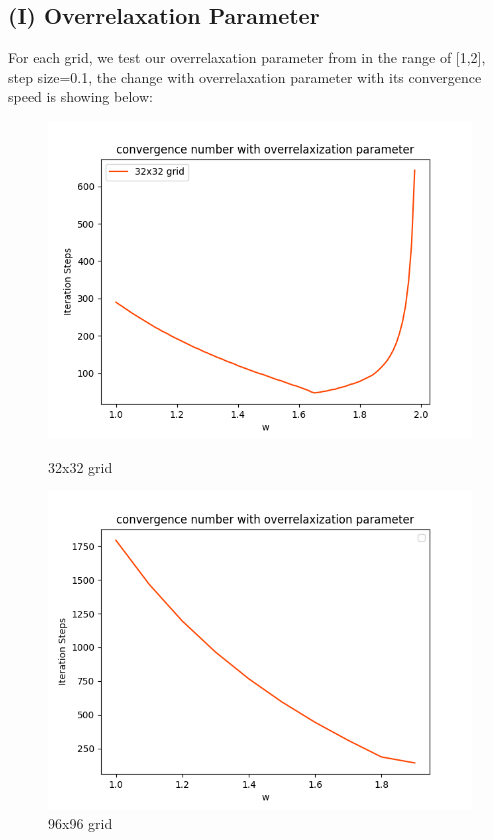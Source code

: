\documentclass[12pt]{article}
\begin{document}
\subsection{(I) Overrelaxation Parameter}
For each grid, we test our overrelaxation parameter from in the range of [1,2], 
step size=0.1, the change with overrelaxation parameter with its convergence speed
is showing below:

\begin{figure}[H]
    \centering
    \begin{minipage}{0.45\textwidth}
        \includegraphics[width=\linewidth]{ws_for32grid.png}
        \caption{32x32 grid}
        \label{fig:32grid}
    \end{minipage}
    \hfill
    \begin{minipage}{0.45\textwidth}
        \includegraphics[width=\linewidth]{0.01ws_for96grid.png}
        \caption{96x96 grid}
        \label{fig:96grid}
    \end{minipage}


\end{figure}
\end{document}
